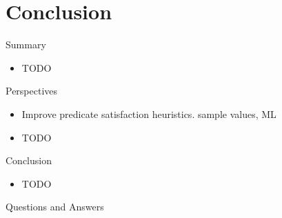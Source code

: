 \section{Conclusion}

{  %
\begin{frame}{Summary}
  \begin{itemize}
  \item TODO
  \end{itemize}
\end{frame}
}

\begin{frame}{Perspectives}
  \begin{itemize}
  \item Improve predicate satisfaction heuristics. \Eg sample values, ML
  \item TODO
  \end{itemize}
\end{frame}

\begin{frame}{Conclusion}
  \begin{itemize}
  \item TODO
  \end{itemize}
\end{frame}

\begin{frame}{Questions and Answers}
\end{frame}
